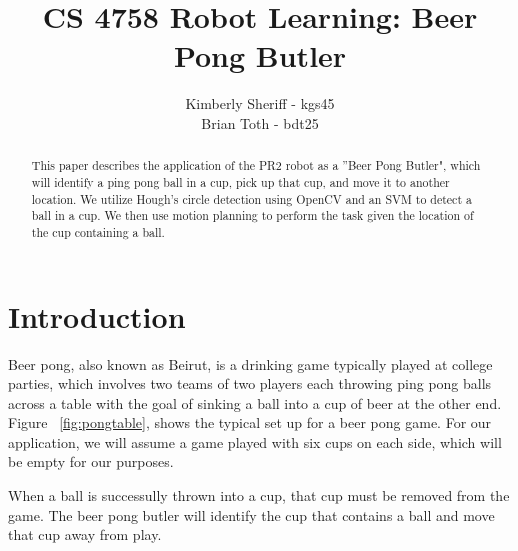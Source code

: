\documentclass[letterpaper, 10 pt, conference]{ieeeconf}  %
\title{\LARGE \bf
CS 4758 Robot Learning: Beer Pong Butler
}
\author{Kimberly Sheriff - kgs45\\Brian Toth - bdt25}
\begin{document}
\maketitle
\thispagestyle{empty}
\pagestyle{empty}


\begin{abstract}

This paper describes the application of the PR2 robot as a ''Beer Pong Butler", which will identify a ping pong ball in a cup, pick up that cup, and move it to another location. We utilize Hough’s circle detection using OpenCV and an SVM to detect a ball in a cup. We then use motion planning to perform the task given the location of the cup containing a ball.

\end{abstract}


\section{Introduction}

Beer pong, also known as Beirut, is a drinking game typically played at college parties, which involves two teams of two players each throwing ping pong balls across a table with the goal of sinking a ball into a cup of beer at the other end. Figure ~\ref{fig:pongtable}, shows the typical set up for a beer pong game. For our application, we will assume a game played with six cups on each side, which will be empty for our purposes. 

When a ball is successully thrown into a cup, that cup must be removed from the game. The beer pong butler will identify the cup that contains a ball and move that cup away from play.
\end{document}
